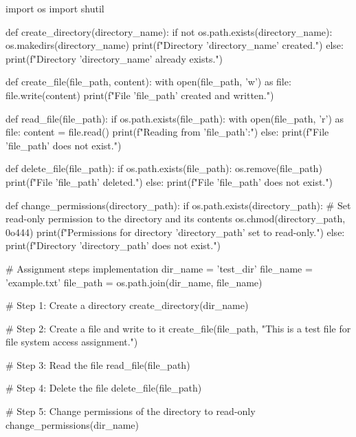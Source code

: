 \documentclass[12pt]{article}
\begin{document}
\begin{python}
import os
import shutil

def create_directory(directory_name):
    if not os.path.exists(directory_name):
        os.makedirs(directory_name)
        print(f"Directory '{directory_name}' created.")
    else:
        print(f"Directory '{directory_name}' already exists.")

def create_file(file_path, content):
    with open(file_path, 'w') as file:
        file.write(content)
        print(f"File '{file_path}' created and written.")

def read_file(file_path):
    if os.path.exists(file_path):
        with open(file_path, 'r') as file:
            content = file.read()
            print(f"Reading from '{file_path}':")
    else:
        print(f"File '{file_path}' does not exist.")

def delete_file(file_path):
    if os.path.exists(file_path):
        os.remove(file_path)
        print(f"File '{file_path}' deleted.")
    else:
        print(f"File '{file_path}' does not exist.")

def change_permissions(directory_path):
    if os.path.exists(directory_path):
        # Set read-only permission to the directory and its contents
        os.chmod(directory_path, 0o444)
        print(f"Permissions for directory '{directory_path}' set to read-only.")
    else:
        print(f"Directory '{directory_path}' does not exist.")

# Assignment steps implementation
dir_name = 'test_dir'
file_name = 'example.txt'
file_path = os.path.join(dir_name, file_name)

# Step 1: Create a directory
create_directory(dir_name)

# Step 2: Create a file and write to it
create_file(file_path, "This is a test file for file system access assignment.")

# Step 3: Read the file
read_file(file_path)

# Step 4: Delete the file
delete_file(file_path)

# Step 5: Change permissions of the directory to read-only
change_permissions(dir_name)
\end{python}
\end{document}
